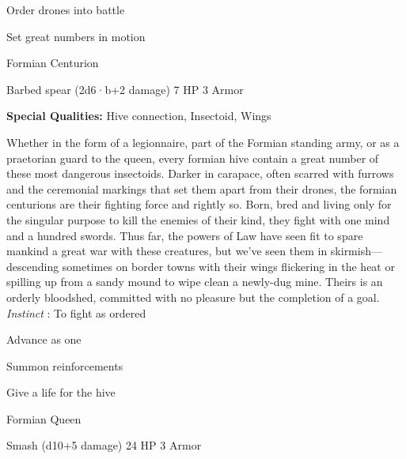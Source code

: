 \startitemize[1,packed]
         
\item Order drones into battle

         
\item Set great numbers in motion

       
\stopitemize
       
\startMonsterName
Formian Centurion	 
\stopMonsterName
       

Barbed spear (2d6·b+2 damage)	7 HP	3 Armor

       


       
\startMonsterQualities
         {\bf Special Qualities:}  Hive connection, Insectoid, Wings
\stopMonsterQualities
       
\startMonsterDescription
Whether in the form of a legionnaire, part of the Formian standing army, or as a praetorian guard to the queen, every formian hive contain a great number of these most dangerous insectoids. Darker in carapace, often scarred with furrows and the ceremonial markings that set them apart from their drones, the formian centurions are their fighting force and rightly so. Born, bred and living only for the singular purpose to kill the enemies of their kind, they fight with one mind and a hundred swords. Thus far, the powers of Law have seen fit to spare mankind a great war with these creatures, but we’ve seen them in skirmish—descending sometimes on border towns with their wings flickering in the heat or spilling up from a sandy mound to wipe clean a newly-dug mine. Theirs is an orderly bloodshed, committed with no pleasure but the completion of a goal. {\em Instinct} : To fight as ordered
\stopMonsterDescription
       
\startitemize[1,packed]
         
\item Advance as one

         
\item Summon reinforcements

         
\item Give a life for the hive

       
\stopitemize
       
\startMonsterName
Formian Queen	 
\stopMonsterName
       

Smash (d10+5 damage)	24 HP	3 Armor

